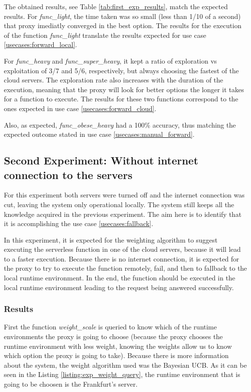 \documentclass[conference]{IEEEtran}
\begin{document}
The obtained results, see Table \ref{tab:first_exp_results}, match the expected
results. For \textit{func\_light}, the time taken was so small (less than 1/10 of
a second) that proxy imediatly converged in the best option. The results for the
execution of the function \textit{func\_light} translate the results expected for
use case \ref{usecases:forward_local}.

For \textit{func\_heavy} and \textit{func\_super\_heavy}, it kept a ratio of
exploration vs exploitation of 3/7 and 5/6, respectively, but always choosing the
fastest of the cloud servers. The exploration rate also increases with the
duration of the execution, meaning that the proxy will look for better options the
longer it takes for a function to execute. The results for these two functions
correspond to the ones expected in use case \ref{usecases:forward_cloud}.

Also, as expected, \textit{func\_obese\_heavy} had a 100\% accuracy, thus matching
the expected outcome stated in use case \ref{usecases:manual_forward}.

\subsection{Second Experiment: Without internet connection to the servers}
For this experiment both servers were turned off and the internet connection was
cut, leaving the system only operational locally. The system still keeps all the
knowledge acquired in the previous experiment.
The aim here is to identify that it is accomplishing the use case
\ref{usecases:fallback}.

In this experiment, it is expected for the weighting algorithm to suggest
executing the serverless function in one of the cloud servers, because it will
lead to a faster execution. Because there is no internet connection, it is
expected for the proxy to try to execute the function remotely, fail, and then to
fallback to the local runtime environment. In the end, the function should be
executed in the local runtime environment leading to the request being answered
successfully.

\subsubsection{Results}
First the function \textit{weight\_scale} is queried to know which of the runtime
environments the proxy is going to choose (because the proxy chooses the runtime
environment with less weight, knowing the weights allow us to know which option
the proxy is going to take). Because there is more information about the system,
the weight algorithm used was the Bayesian UCB. As it can be seen in the Listing
\ref{listing:exp_weight_query}, the runtime environment that is going to be
choosen is the Frankfurt's server.
\end{document}

